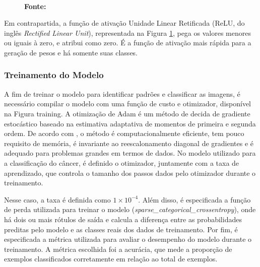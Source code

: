 \begin{figure}[ht]
\begin{minipage}{0.45\textwidth}
  \captionsetup{justification=centering}
  \vspace{-0.2cm}
  \\\textbf{\footnotesize Fonte: \cite{relu}}
  \label{fig:relu}
\end{minipage}
\end{figure}

Em contrapartida, a função de ativação Unidade Linear Retificada (ReLU, do inglês \textit{Rectified Linear Unit}), representada na Figura \ref{fig:relu}, pega os valores menores ou iguais à zero, e atribui como zero. É a função de ativação mais rápida para a geração de pesos e há somente suas classes.




\subsubsection{\esp Treinamento do Modelo} \label{treinamento}

A fim de treinar o modelo para identificar padrões e classificar as imagens, é necessário compilar o modelo com uma função de custo e otimizador, disponível na Figura training. A otimização de Adam é um método de decida de gradiente estocástico baseado na estimativa adaptativa de momentos de primeira e segunda ordem. De acordo com , o método é computacionalmente eficiente, tem pouco requisito de memória, é invariante ao reescalonamento diagonal de gradientes e é adequado para problemas grandes em termos de dados. No modelo utilizado para a classificação do câncer, é definido o otimizador, juntamente com a taxa de aprendizado, que controla o tamanho dos passos dados pelo otimizador durante o treinamento. 


Nesse caso, a taxa é definida como \ensuremath{1 \times 10^{-4}}. Além disso, é especificada a função de perda utilizada para treinar o modelo (\textit{sparse\_categorical\_crossentropy}), onde há dois ou mais rótulos de saída e calcula a diferença entre as probabilidades preditas pelo modelo e as classes reais dos dados de treinamento. Por fim, é especificada a métrica utilizada para avaliar o desempenho do modelo durante o treinamento. A métrica escolhida foi a acurácia, que mede a proporção de exemplos classificados corretamente em relação ao total de exemplos. 

